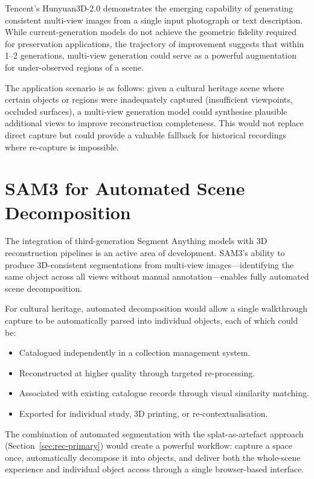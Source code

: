 Tencent's Hunyuan3D-2.0 \parencite{Zhao2025Hunyuan} demonstrates the emerging capability of generating consistent multi-view images from a single input photograph or text description. While current-generation models do not achieve the geometric fidelity required for preservation applications, the trajectory of improvement suggests that within 1--2 generations, multi-view generation could serve as a powerful augmentation for under-observed regions of a scene.

The application scenario is as follows: given a cultural heritage scene where certain objects or regions were inadequately captured (insufficient viewpoints, occluded surfaces), a multi-view generation model could synthesise plausible additional views to improve reconstruction completeness. This would not replace direct capture but could provide a valuable fallback for historical recordings where re-capture is impossible.

\section{SAM3 for Automated Scene Decomposition}
\label{sec:fut-sam3}

The integration of third-generation Segment Anything models with 3D reconstruction pipelines is an active area of development. SAM3's ability to produce 3D-consistent segmentations from multi-view images---identifying the same object across all views without manual annotation---enables fully automated scene decomposition.

For cultural heritage, automated decomposition would allow a single walkthrough capture to be automatically parsed into individual objects, each of which could be:

\begin{itemize}
  \item Catalogued independently in a collection management system.
  \item Reconstructed at higher quality through targeted re-processing.
  \item Associated with existing catalogue records through visual similarity matching.
  \item Exported for individual study, 3D printing, or re-contextualisation.
\end{itemize}

The combination of automated segmentation with the splat-as-artefact approach (Section~\ref{sec:rec-primary}) would create a powerful workflow: capture a space once, automatically decompose it into objects, and deliver both the whole-scene experience and individual object access through a single browser-based interface.

